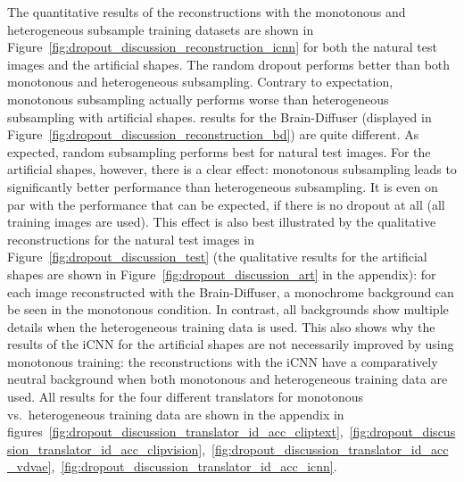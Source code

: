 The quantitative results of the reconstructions with the monotonous and heterogeneous subsample training datasets are shown in Figure~\ref{fig:dropout_discussion_reconstruction_icnn} for both the natural test images and the artificial shapes. The random dropout performs better than both monotonous and heterogeneous subsampling. Contrary to expectation, monotonous subsampling actually performs worse than heterogeneous subsampling with artificial shapes.  results for the Brain-Diffuser (displayed in Figure~\ref{fig:dropout_discussion_reconstruction_bd}) are quite different. As expected, random subsampling performs best for natural test images. For the artificial shapes, however, there is a clear effect: monotonous subsampling leads to significantly better performance than heterogeneous subsampling. It is even on par with the performance that can be expected, if there is no dropout at all (all training images are used). This effect is also best illustrated by the qualitative reconstructions for the natural test images in Figure~\ref{fig:dropout_discussion_test} (the qualitative results for the artificial shapes are shown in Figure~\ref{fig:dropout_discussion_art} in the appendix): for each image reconstructed with the Brain-Diffuser, a monochrome background can be seen in the monotonous condition. In contrast, all backgrounds show multiple details when the heterogeneous training data is used. This also shows why the results of the iCNN for the artificial shapes are not necessarily improved by using monotonous training: the reconstructions with the iCNN have a comparatively neutral background when both monotonous and heterogeneous training data are used. All results for the four different translators for monotonous vs.\ heterogeneous training data are shown in the appendix in figures~\ref{fig:dropout_discussion_translator_id_acc_cliptext},~\ref{fig:dropout_discussion_translator_id_acc_clipvision},~\ref{fig:dropout_discussion_translator_id_acc_vdvae},~\ref{fig:dropout_discussion_translator_id_acc_icnn}. 

